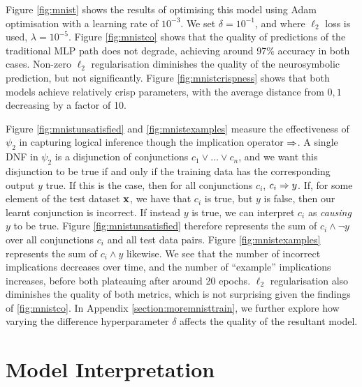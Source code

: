 Figure \ref{fig:mnist} shows the results of optimising this model using Adam optimisation with a learning rate of $10^{-3}$. We set $\delta=10^{-1}$, and where $\ell_2$ loss is used, $\lambda = 10^{-5}$. Figure \ref{fig:mnistco} shows that the quality of predictions of the traditional MLP path does not degrade, achieving around 97\% accuracy in both cases. Non-zero $\ell_2$ regularisation diminishes the quality of the neurosymbolic prediction, but not significantly. Figure \ref{fig:mnistcrispness} shows that both models achieve relatively crisp parameters, with the average distance from $0,1$ decreasing by a factor of 10.  

Figure \ref{fig:mnistunsatisfied} and \ref{fig:mnistexamples} measure the effectiveness of $\psi_2$ in capturing logical inference though the implication operator $\Rightarrow$. A single DNF in $\psi_2$ is a disjunction of conjunctions $c_1 \lor \dots \lor c_n$, and we want this disjunction to be true if and only if the training data has the corresponding output $y$ true. If this is the case, then for all conjunctions $c_i$, $c_i \Rightarrow y$. If, for some element of the test dataset $\mathbf{x}$, we have that $c_i$ is true, but $y$ is false, then our learnt conjunction is incorrect. If instead $y$ is true, we can interpret $c_i$ as \textit{causing} $y$ to be true. Figure \ref{fig:mnistunsatisfied} therefore represents the sum of $c_i \land \lnot y$ over all conjunctions $c_i$ and all test data pairs. Figure \ref{fig:mnistexamples} represents the sum of $c_i \land y$ likewise. We see that the number of incorrect implications decreases over time, and the number of ``example'' implications increases, before both plateauing after around 20 epochs. $\ell_2$ regularisation also diminishes the quality of both metrics, which is not surprising given the findings of \ref{fig:mnistco}. In Appendix \ref{section:moremnisttrain}, we further explore how varying the difference hyperparameter $\delta$ affects the quality of the resultant model.

\section{Model Interpretation}


